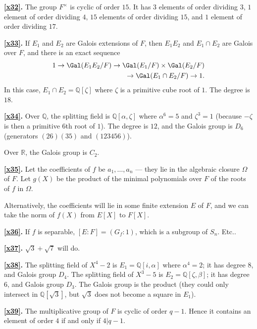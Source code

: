 \documentclass[a4paper,11pt,final,openany]{memoir}
\theoremstyle{nonumberplain}
\begin{document}
\medskip\noindent\textbf{\ref{x32}.} The group $F^{\times}$ is cyclic of order
$15$. It has $3$ elements of order dividing $3$, $1$ element of order dividing
$4$, $15$ elements of order dividing $15$, and $1$ element of order dividing
$17$.

\medskip\noindent\textbf{\ref{x33}.} If $E_{1}$ and $E_{2}$ are Galois
extensions of $F$, then $E_{1}E_{2}$ and $E_{1}\cap E_{2}$ are Galois over
$F$, and there is an exact sequence
\begin{align*}
1\to\Gal(E_{1}E_{2}/F)\to\Gal(E_{1}/F)\times\Gal(E_{2}/F)\\
\to\Gal(E_{1}\cap
E_{2}/F)\to1.
\end{align*}
In this case, $E_{1}\cap E_{2}={\mathbb{Q}}[\zeta]$ where $\zeta$ is a
primitive cube root of $1$. The degree is $18$.

\medskip\noindent\textbf{\ref{x34}.} Over ${\mathbb{Q}}$, the splitting field
is ${\mathbb{Q}}[\alpha,\zeta]$ where $\alpha^{6}=5$ and $\zeta^{3}=1$
(because $-\zeta$ is then a primitive $6$th root of $1$). The degree is $12$,
and the Galois group is $D_{6}$ (generators $(26)(35)$ and $(123456)$).

Over $\mathbb{R}$, the Galois group is $C_{2}$.

\medskip\noindent\textbf{\ref{x35}.} Let the coefficients of $f$ be
$a_{1},\ldots,a_{n}$ --- they lie in the algebraic closure $\Omega$ of $F$.
Let $g(X)$ be the product of the minimal polynomials over $F$ of the roots of
$f$ in $\Omega$.

Alternatively, the coefficients will lie in some finite extension $E$ of $F$,
and we can take the norm of $f(X)$ from $E[X]$ to $F[X]$.

\medskip\noindent\textbf{\ref{x36}.} If $f$ is separable, $[E\colon
F]=(G_{f}\colon1)$, which is a subgroup of $S_{n}$. Etc..

\medskip\noindent\textbf{\ref{x37}.} $\sqrt{3}+\sqrt{7}$ will do.

\medskip\noindent\textbf{\ref{x38}.} The splitting field of $X^{4}-2$ is
$E_{1}={\mathbb{Q}}[i,\alpha]$ where $\alpha^{4}=2$; it has degree $8$, and
Galois group $D_{4}$. The splitting field of $X^{3}-5$ is $E_{2}={\mathbb{Q}%
}[\zeta,\beta]$; it has degree $6$, and Galois group $D_{3}$. The Galois group
is the product (they could only intersect in ${\mathbb{Q}}[\sqrt{3}]$, but
$\sqrt{3}$ does not become a square in $E_{1}$).

\medskip\noindent\textbf{\ref{x39}.} The multiplicative group of $F$ is cyclic
of order $q-1$. Hence it contains an element of order $4$ if and only if
$4|q-1$.
\end{document}

